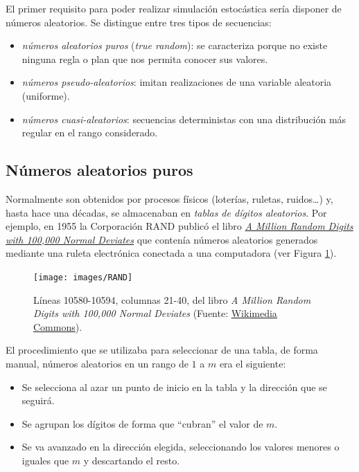 \documentclass[
  10pt,
]{book}
\theoremstyle{break}
\theoremstyle{nonumberplain}
\begin{document}
El primer requisito para poder realizar simulación estocástica sería disponer de números aleatorios.
Se distingue entre tres tipos de secuencias:

\begin{itemize}
\item
  \emph{números aleatorios puros} (\emph{true random}): se caracteriza porque no existe ninguna regla o plan que nos permita conocer sus valores.
\item
  \emph{números pseudo-aleatorios}: imitan realizaciones de una variable aleatoria (uniforme).
\item
  \emph{números cuasi-aleatorios}: secuencias deterministas con una distribución más regular en el rango considerado.
\end{itemize}

\hypertarget{nuxfameros-aleatorios-puros}{%
\subsection{Números aleatorios puros}\label{nuxfameros-aleatorios-puros}}

Normalmente son obtenidos por procesos físicos (loterías, ruletas, ruidos\ldots) y, hasta hace una décadas, se almacenaban en \emph{tablas de dígitos aleatorios}.
Por ejemplo, en 1955 la Corporación RAND publicó el libro \href{https://www.rand.org/pubs/monograph_reports/MR1418.html}{\emph{A Million Random Digits with 100,000 Normal Deviates}} que contenía números aleatorios generados mediante una ruleta electrónica conectada a una computadora (ver Figura \ref{fig:randbook}).



\begin{figure}[!htbp]

{\centering \texttt{[image: images/RAND]} 

}

\caption{Líneas 10580-10594, columnas 21-40, del libro \emph{A Million Random Digits with 100,000 Normal Deviates} (Fuente: \href{https://es.wikipedia.org/wiki/Un_mill\%C3\%B3n_de_d\%C3\%ADgitos_aleatorios_con_100.000_desviaciones_normales}{Wikimedia Commons}).}\label{fig:randbook}
\end{figure}

El procedimiento que se utilizaba para seleccionar de una tabla, de forma manual, números aleatorios en un rango de \(1\) a \(m\) era el siguiente:

\begin{itemize}
\item
  Se selecciona al azar un punto de inicio en la tabla
  y la dirección que se seguirá.
\item
  Se agrupan los dígitos de forma que ``cubran'' el valor de \(m\).
\item
  Se va avanzado en la dirección elegida, seleccionando los valores menores o iguales que \(m\) y descartando el resto.
\end{itemize}
\end{document}
